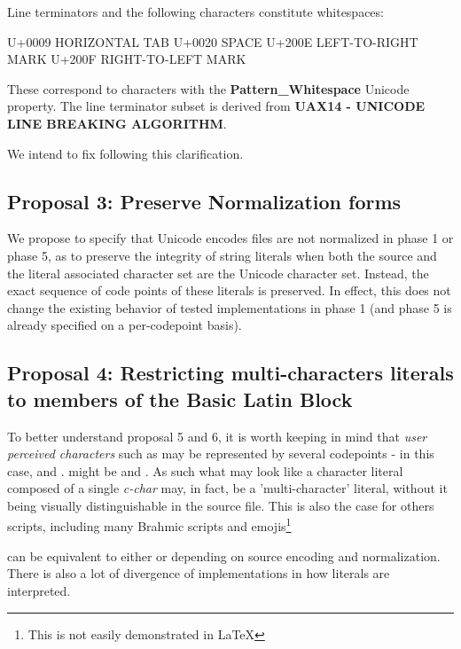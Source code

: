 \documentclass{wg21}
\newcommand{\UnicodeLetter}[1]{\textbf{\textcolor{BrickRed}{\Large\tcode{#1}}}}
\begin{document}
Line terminators and the following characters constitute whitespaces:

\begin{codeblock}
U+0009 HORIZONTAL TAB
U+0020 SPACE
U+200E LEFT-TO-RIGHT MARK
U+200F RIGHT-TO-LEFT MARK 
\end{codeblock} 

These correspond to characters with the \textbf{Pattern_Whitespace} Unicode property.
The line terminator subset is derived from \textbf{UAX14 - UNICODE LINE BREAKING ALGORITHM}.

We intend to fix  following this clarification.

\subsection{Proposal 3: Preserve Normalization forms}

We propose to specify that Unicode encodes files are not normalized in phase 1 or phase 5, as to preserve the integrity 
of string literals when both the source and the literal associated character set are the Unicode character set.
Instead, the exact sequence of code points of these literals is preserved.
In effect, this does not change the existing behavior of tested implementations in phase 1 (and phase 5 is already specified on a per-codepoint basis).

\pagebreak

\subsection{Proposal 4: Restricting multi-characters literals to members of the Basic Latin Block}
To better understand proposal 5 and 6, it is worth keeping in mind that \emph{user perceived characters} such as \UnicodeLetter{공} may be represented by several codepoints - in this case, \UnicodeLetter{ㄱ} and \UnicodeLetter{ㅎ}. \UnicodeLetter{é} might be \UnicodeLetter{e} and \UnicodeLetter{´}. As such what may look like a character literal composed of a single \emph{c-char} may, in fact, be a 'multi-character' literal, without it being visually distinguishable in the source file.
This is also the case for others scripts, including many Brahmic scripts and emojis\footnote{This is not easily demonstrated in \LaTeX}



can be equivalent to either  or 
depending on source encoding and normalization.
There is also a lot of divergence of implementations in how literals are interpreted. 
\end{document}
